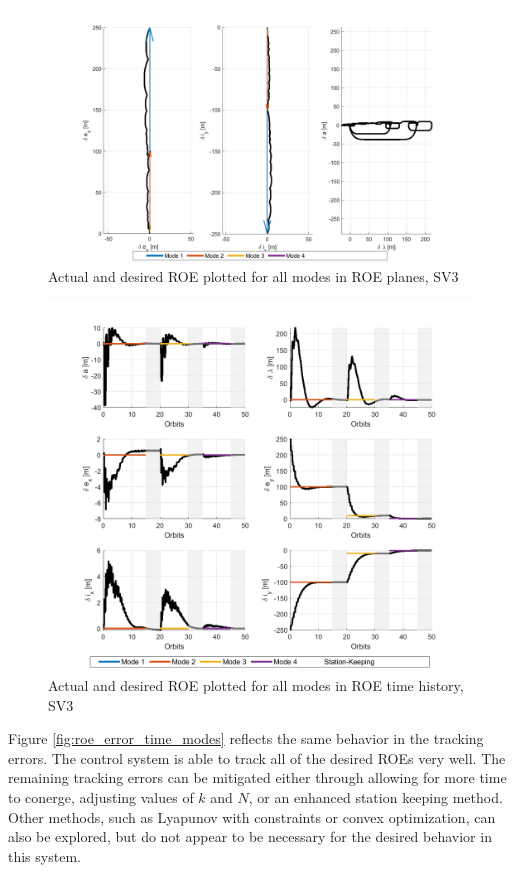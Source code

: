 \begin{figure}[H]
    \centering
    \includegraphics[width=0.75\linewidth]{sim/figures/PS6/ROE_planes_modes_SV3.png}
    \caption{Actual and desired ROE plotted for all modes in ROE planes, SV3}
    \label{fig:roe_planes_modes}
\end{figure}
\begin{figure}[H]
    \centering
    \includegraphics[width=0.75\linewidth]{sim/figures/PS6/ROE_over_time_modes_SV3.png}
    \caption{Actual and desired ROE plotted for all modes in ROE time history, SV3}
    \label{fig:roe_time_modes}
\end{figure}

Figure \ref{fig:roe_error_time_modes} reflects the same behavior in the tracking errors. The control system is able to track all of the desired ROEs very well. The remaining tracking errors can be mitigated either through allowing for more time to conerge, adjusting values of $k$ and $N$, or an enhanced station keeping method. Other methods, such as Lyapunov with constraints or convex optimization, can also be explored, but do not appear to be necessary for the desired behavior in this system. 

